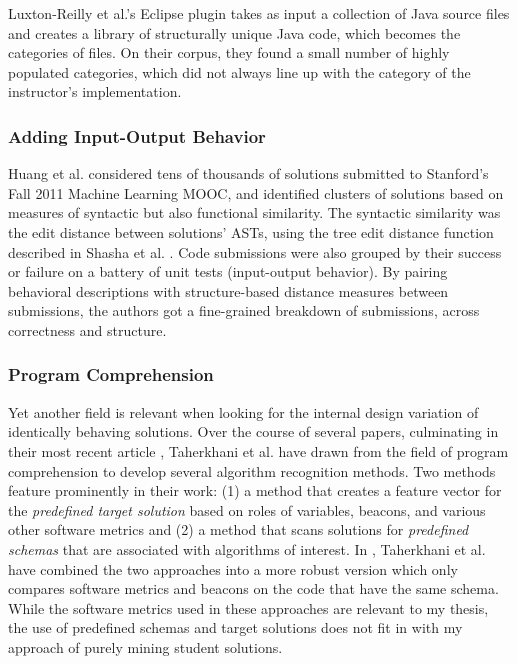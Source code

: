 Luxton-Reilly et al.'s Eclipse plugin takes as input a collection of Java source files and creates a library of structurally unique Java code, which becomes the categories of files. On their corpus, they found a small number of highly populated categories, which did not always line up with the category of the instructor's implementation.

\subsubsection{Adding Input-Output Behavior}

Huang et al. \cite{MOOCshop} considered tens of thousands of solutions submitted to Stanford's Fall 2011 Machine Learning MOOC, and identified clusters of solutions based on measures of syntactic but also functional similarity. The syntactic similarity was the edit distance between solutions' ASTs, using the tree edit distance function described in Shasha et al. \cite{shasha1994exact}. Code submissions were also grouped by their success or failure on a battery of unit tests (input-output behavior). By pairing behavioral descriptions with structure-based distance measures between submissions, the authors got a fine-grained breakdown of submissions, across correctness and structure.

\subsubsection{Program Comprehension}

Yet another field is relevant when looking for the internal design variation of identically behaving solutions. Over the course of several papers, culminating in their most recent article \cite{taherkhani13}, Taherkhani et al. have drawn from the field of program comprehension to develop several algorithm recognition methods. Two methods feature prominently in their work: (1) a method that creates a feature vector for the \emph{predefined target solution} based on roles of variables, beacons, and various other software metrics and (2) a method that scans solutions for \emph{predefined schemas} that are associated with algorithms of interest. In \cite{taherkhani13}, Taherkhani et al. have combined the two approaches into a more robust version which only compares software metrics and beacons on the code that have the same schema. While the software metrics used in these approaches are relevant to my thesis, the use of predefined schemas and target solutions does not fit in with my approach of purely mining student solutions.

